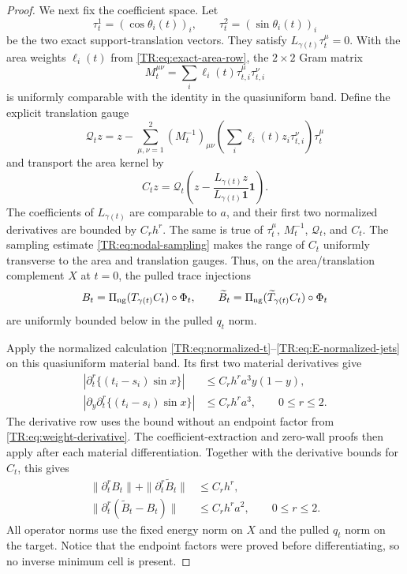 \documentclass[11pt]{amsart}
\numberwithin{equation}{section}
\theoremstyle{definition}
\theoremstyle{remark}
\newcommand{\PiNG}{\Pi_{\rm ng}}
\begin{document}
\begin{proof}
We next fix the coefficient space.  Let
\[
 \tau_t^1=(\cos\theta_i(t))_i,\qquad
 \tau_t^2=(\sin\theta_i(t))_i
\]
be the two exact support-translation vectors.  They satisfy
$L_{\gamma(t)}\tau_t^\mu=0$.  With the area weights
$\ell_i(t)$ from \eqref{TR:eq:exact-area-row}, the $2\times2$ Gram matrix
\[
 M_t^{\mu\nu}=\sum_i\ell_i(t)\tau_{t,i}^\mu\tau_{t,i}^\nu
\]
is uniformly comparable with the identity in the quasiuniform band.
Define the explicit translation gauge
\begin{equation}\label{TR:eq:translation-gauge}
 \mathcal Q_tz=z-\sum_{\mu,\nu=1}^2
 (M_t^{-1})_{\mu\nu}
 \left(\sum_i\ell_i(t)z_i\tau_{t,i}^\nu\right)\tau_t^\mu
\end{equation}
and transport the area kernel by
\begin{equation}\label{TR:eq:area-transport}
 C_tz=\mathcal Q_t\left(
 z-\frac{L_{\gamma(t)}z}{L_{\gamma(t)}\mathbf1}\mathbf1\right).
\end{equation}
The coefficients of $L_{\gamma(t)}$ are comparable to $a$, and their
first two normalized derivatives are bounded by $C_rh^r$.  The same is
true of $\tau_t^\mu$, $M_t^{-1}$, $\mathcal Q_t$, and $C_t$.
The sampling estimate \eqref{TR:eq:nodal-sampling} makes the range of
$C_t$ uniformly transverse to the area and translation gauges.  Thus,
on the area/translation complement $X$ at $t=0$, the pulled trace injections
\begin{equation*}
 B_t=\PiNG(T_{\gamma(t)}C_t)\circ\Phi_t,
 \qquad
 \widetilde B_t=\PiNG(\widetilde T_{\gamma(t)}C_t)\circ\Phi_t
\end{equation*}
are uniformly bounded below in the pulled $q_t$ norm.

Apply the normalized calculation
\eqref{TR:eq:normalized-t}--\eqref{TR:eq:E-normalized-jets} on this
quasiuniform material band.  Its first two material derivatives give
\begin{align}
 \left|\partial_t^r\{(t_i-s_i)\sin x\}\right|
 &\le C_rh^ra^3y(1-y),\label{TR:eq:material-E-value}\\
 \left|\partial_y\partial_t^r\{(t_i-s_i)\sin x\}\right|
 &\le C_rh^ra^3,\qquad 0\le r\le2.
 \label{TR:eq:material-E-derivative}
\end{align}
The derivative row uses the bound without an endpoint factor from
\eqref{TR:eq:weight-derivative}.  The coefficient-extraction and zero-wall
proofs then apply after each material differentiation.  Together with
the derivative bounds for $C_t$, this gives
\begin{align}
 \|\partial_t^rB_t\|+\|\partial_t^r\widetilde B_t\|
 &\le C_rh^r,
 \label{TR:eq:B-material}\\
 \|\partial_t^r(\widetilde B_t-B_t)\|
 &\le C_rh^ra^2,\qquad 0\le r\le2.
 \label{TR:eq:DeltaB-material}
\end{align}
All operator norms use the fixed energy norm on $X$ and the pulled
$q_t$ norm on the target.  Notice that the endpoint factors were proved
before differentiating, so no inverse minimum cell is present.


\end{proof}
\end{document}
